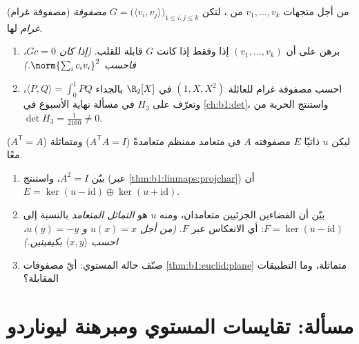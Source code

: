 \begin{exercise}[$\star\star$]\label{exo:b1:euclid:11}
(مصفوفة غرام) من أجل متجهات $v_1, \dots, v_k$ من ، لتكن $G = \bigl(\langle v_i, v_j\rangle\bigr)_{1 \leq i, j
\leq k}$ \emph{مصفوفة غرام} لها.
\begin{enumerate}
  \item برهن على أن $(v_1, \dots, v_k)$  إذا وفقط إذا كانت
        $G$ قابلة للقلب. \emph{(إذا كان $Gc = 0$، فاحسب
        $\norm{\sum_i c_i v_i}^2$.)}
  \item احسب مصفوفة غرام للعائلة $(1, X, X^2)$ في $\R_2[X]$
        بالجداء $\langle P, Q\rangle = \int_0^1 PQ$، وتعرّف على
         $H_3$ في مسألة نهاية الأسبوع في
        \cref{ch:b1:det}، واستنتج الحرية من $\det H_3 =
        \frac1{2160} \neq 0$.
\end{enumerate}
\end{exercise}

\begin{exercise}[$\star\star\star$]\label{exo:b1:euclid:12}
ليكن $u$  ذاتيًا  $E$ مصفوفته
$A$ في  متعامد ممنظم متعامدةً ($A^{\mathsf T}A
= I$) ومتماثلة ($A^{\mathsf T} = A$) معًا.
\begin{enumerate}
  \item بيّن $A^2 = I$، واستنتج (عبر
        \cref{thm:b1:linmaps:projchar}) أن $E = \ker(u -
        \mathrm{id}) \oplus \ker(u + \mathrm{id})$.
  \item بيّن أن الفضاءين الجزئيين متعامدان، ومنه  $u$
        هو \emph{التماثل المتعامد} بالنسبة إلى $F =
        \ker(u - \mathrm{id})$: أي الانعكاس عبر $F$.
        \emph{(من أجل $u(x) = x$ و $u(y) = -y$، احسب $\langle
        x, y\rangle$ بكيفيتين.)}
  \item صنّف حالة المستوي: أيّ مصفوفات
        \cref{thm:b1:euclid:plane} متماثلة، وما التطبيقات
        المقابلة؟
\end{enumerate}
\end{exercise}

\section{مسألة: تقايسات المستوي ومبرهنة ليوناردو}

